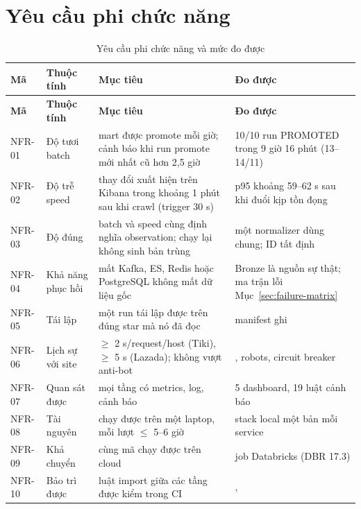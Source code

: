\section{Yêu cầu phi chức năng}
\begin{xltabular}{\linewidth}{@{}L{14mm}L{28mm}Y L{36mm}@{}}
  \caption{Yêu cầu phi chức năng và mức đo được}\label{tab:nfr}\\
  \toprule
  \textbf{Mã} & \textbf{Thuộc tính} & \textbf{Mục tiêu} & \textbf{Đo được} \\
  \midrule
  \endfirsthead
  \toprule \textbf{Mã} & \textbf{Thuộc tính} & \textbf{Mục tiêu} & \textbf{Đo được} \\ \midrule
  \endhead
  NFR-01 & Độ tươi batch & mart được promote mỗi giờ; cảnh báo khi run promote mới nhất cũ hơn 2,5 giờ & 10/10 run PROMOTED trong 9 giờ 16 phút (13--14/11) \\
  NFR-02 & Độ trễ speed & thay đổi xuất hiện trên Kibana trong khoảng 1 phút sau khi crawl (trigger 30 s) & p95 khoảng 59--62 s sau khi đuổi kịp tồn đọng \\
  NFR-03 & Độ đúng & batch và speed cùng định nghĩa observation; chạy lại không sinh bản trùng & một normalizer dùng chung; ID tất định \\
  NFR-04 & Khả năng phục hồi & mất Kafka, ES, Redis hoặc PostgreSQL không mất dữ liệu gốc & Bronze là nguồn sự thật; ma trận lỗi Mục~\ref{sec:failure-matrix} \\
  NFR-05 & Tái lập & một run tái lập được trên đúng star mà nó đã đọc & manifest ghi  \\
  NFR-06 & Lịch sự với site & $\ge$ 2 s/request/host (Tiki), $\ge$ 5 s (Lazada); không vượt anti-bot & , robots, circuit breaker \\
  NFR-07 & Quan sát được & mọi tầng có metrics, log, cảnh báo & 5 dashboard, 19 luật cảnh báo \\
  NFR-08 & Tài nguyên & chạy được trên một laptop, mỗi lượt $\le$ 5--6 giờ & stack local một bản mỗi service \\
  NFR-09 & Khả chuyển & cùng mã chạy được trên cloud & job Databricks (DBR 17.3) \\
  NFR-10 & Bảo trì được & luật import giữa các tầng được kiểm trong CI & ,  \\
  \bottomrule
\end{xltabular}


